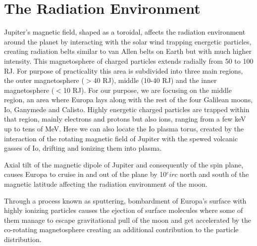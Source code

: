 \section{The Radiation Environment}\label{sec:radiation_environment}
Jupiter’s magnetic field, shaped as a toroidal, affects the radiation environment around the planet by interacting with the solar wind trapping energetic particles, creating radiation belts similar to van Allen belts on Earth but with much higher intensity. This magnetosphere of charged particles extends radially from 50 to 100 RJ. For purpose of practicality this area is subdivided into three main regions, the outer magnetosphere ($>$40 RJ), middle (10-40 RJ) and the inner magnetosphere ($<$10 RJ). For our purpose, we are focusing on the middle region, an area where Europa lays along with the rest of the four Galilean moons, Io, Ganymede and Calisto. Highly energetic charged particles are trapped within that region, mainly electrons and protons but also ions, ranging from a few keV up to tens of MeV. Here we can also locate the Io plasma torus, created by the interaction of the rotating magnetic field of Jupiter with the spewed volcanic gasses of Io, drifting and ionizing them into plasma.

Axial tilt of the magnetic dipole of Jupiter and consequently of the spin plane, causes Europa to cruise in and out of the plane by 10$^circ$ north and south of the magnetic latitude affecting the radiation environment of the moon. 

Through a process known as sputtering, bombardment of Europa’s surface with highly ionizing particles causes the ejection of surface molecules where some of them manage to escape gravitational pull of the moon and get accelerated by the co-rotating magnetosphere creating an additional contribution to the particle distribution. 

